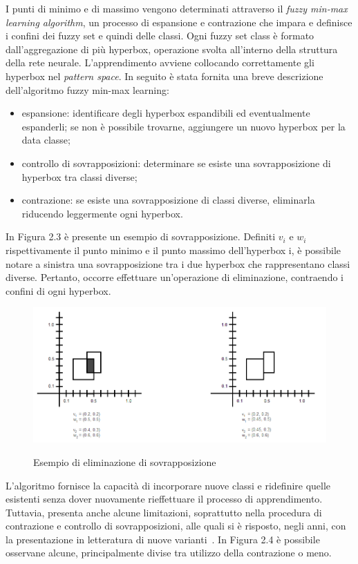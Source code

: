 \documentclass[11pt,  oneside, openany]{book}
\begin{document}
I punti di minimo e di massimo vengono determinati attraverso il \textit{fuzzy min-max learning algorithm}, un processo di espansione e contrazione che impara e definisce i confini dei fuzzy set e quindi delle classi. Ogni fuzzy set class è formato dall'aggregazione di più hyperbox, operazione svolta all'interno della struttura della rete neurale. L'apprendimento avviene collocando correttamente gli hyperbox nel \textit{pattern space}. In seguito è stata fornita una breve descrizione dell'algoritmo fuzzy min-max learning: 

\begin{itemize}
\item espansione: identificare degli hyperbox espandibili ed eventualmente espanderli; se non è possibile trovarne, aggiungere un nuovo hyperbox per la data classe;
\item controllo di sovrapposizioni: determinare se esiste una sovrapposizione di hyperbox tra classi diverse;
\item contrazione: se esiste una sovrapposizione di classi diverse, eliminarla riducendo leggermente ogni hyperbox.
\end{itemize}

In Figura 2.3 è presente un esempio di sovrapposizione. Definiti $v_i$ e $w_i$ rispettivamente il punto minimo e il punto massimo dell'hyperbox i, è possibile notare a sinistra una sovrapposizione tra i due hyperbox che rappresentano classi diverse. Pertanto, occorre effettuare un'operazione di eliminazione, contraendo i confini di ogni hyperbox. 

\begin{figure}[h!]
\begin{center}
  \includegraphics[width=12cm]{Immagini/elimination_overlap.png}\\
  \caption{Esempio di eliminazione di sovrapposizione}
\end{center}
\end{figure}


L'algoritmo fornisce la capacità di incorporare nuove classi e ridefinire quelle esistenti senza dover nuovamente rieffettuare il processo di apprendimento. Tuttavia, presenta anche alcune limitazioni, soprattutto nella procedura di contrazione e controllo di sovrapposizioni, alle quali si è risposto, negli anni, con la presentazione in letteratura di nuove varianti~\cite{fmmnn_variants}. In Figura 2.4 è possibile osservane alcune, principalmente divise tra utilizzo della contrazione o meno. 
\end{document}
